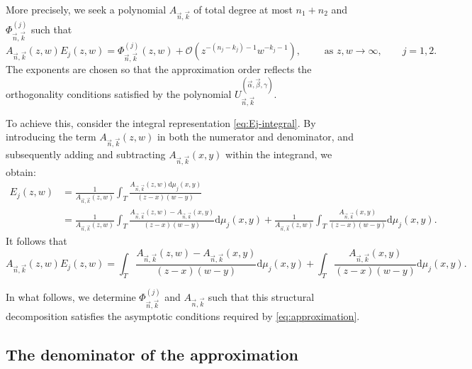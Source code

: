 \documentclass[11pt,reqno]{amsart}
\theoremstyle{definition}
\begin{document}
More precisely, we seek a polynomial $A_{\vec n,\vec k}$ of total degree at most $n_1+n_2$ and $\Phi_{\vec n,\vec k}^{(j)}$ such that 
\begin{equation}
\label{eq:approximation}
    A_{\vec n,\vec k}(z,w)E_j(z,w)=\Phi_{\vec n,\vec k}^{(j)}(z,w) + \mathcal{O}(z^{-(n_j-k_j)-1} w^{-k_j-1}),\qquad \text{ as } z,w\longrightarrow \infty,\qquad j =1,2.
\end{equation}
The exponents are chosen so that the approximation order reflects the orthogonality conditions satisfied by the polynomial
$U^{(\vec\alpha,\vec\beta,\gamma)}_{\vec n,\vec k}$.

To achieve this, consider the integral representation \eqref{eq:Ej-integral}. By introducing the term $A_{\vec n,\vec k}(z,w)$ in both the numerator and denominator, and subsequently adding and subtracting $A_{\vec n,\vec k}(x,y)$ within the integrand, we obtain:
$$
\begin{aligned}
    E_j(z,w)&=\frac{1}{A_{\vec n,\vec k}(z,w)} \int_{T} \frac{A_{\vec n,\vec k}(z,w) \mathrm{d} \mu_j (x,y)}{(z-x)(w-y)}  
    \\
    &= \frac{1}{A_{\vec n,\vec k}(z,w)} \int_{T} \frac{A_{\vec n,\vec k}(z,w)-A_{\vec n,\vec k}(x,y) }{(z-x)(w-y)} \mathrm{d} \mu_j (x,y)  +\frac{1}{A_{\vec n,\vec k}(z,w)} \int_{T} \frac{A_{\vec n,\vec k}(x,y) }{(z-x)(w-y)} \mathrm{d} \mu_j (x,y).
\end{aligned}
$$
It follows that
\begin{equation}
    \label{eq:approximation-integrals}
    A_{\vec n,\vec k}(z,w)E_j(z,w) = \int_{T} \frac{A_{\vec n,\vec k}(z,w)-A_{\vec n,\vec k}(x,y) }{(z-x)(w-y)} \mathrm{d} \mu_j (x,y) +\int_{T} \frac{A_{\vec n,\vec k}(x,y) }{(z-x)(w-y)} \mathrm{d} \mu_j (x,y).
\end{equation}

In what follows, we determine $\Phi_{\vec n,\vec k}^{(j)}$ and $A_{\vec n,\vec k}$ such that this structural decomposition satisfies the asymptotic conditions required by \eqref{eq:approximation}.

\subsection{The denominator of the approximation}
\end{document}
